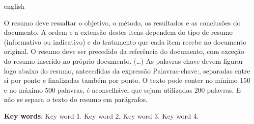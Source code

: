 

\begin{resumo}[Abstract]
\begin{otherlanguage*}{english}

O resumo deve ressaltar o objetivo, o método, os resultados e as conclusões do documento. A ordem e a extensão destes itens dependem do tipo de resumo (informativo ou indicativo) e do tratamento que cada item recebe no documento original. O resumo deve ser precedido da referência do documento, com exceção do resumo inserido no próprio documento. (\ldots) As palavras-chave devem figurar logo abaixo do resumo, antecedidas da expressão Palavras-chave:, separadas entre si por ponto e finalizadas também por ponto. O texto pode conter no mínimo 150 e no máximo 500 palavras, é aconselhável que sejam utilizadas 200 palavras. E não se separa o texto do resumo em parágrafos.


\vspace{\onelineskip}
\noindent
\textbf{Key words}: Key word 1. Key word 2. Key word 3. Key word 4.
\end{otherlanguage*}
\end{resumo}
